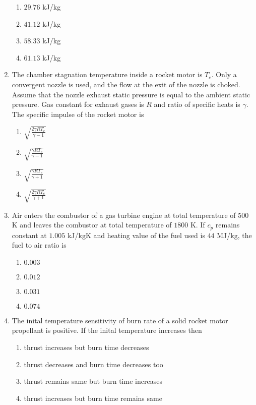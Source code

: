 \documentclass[journal,onecolumn]{IEEEtran}
\theoremstyle{remark}
\begin{document}
\begin{enumerate}
	\begin{enumerate}
		\item $29.76$ kJ/kg
		\item $41.12$ kJ/kg
		\item $58.33$ kJ/kg
		\item $61.13$ kJ/kg
	\end{enumerate}


    \item The chamber stagnation temperature inside a rocket motor is $T_e$. Only a convergent nozzle is used, and the flow at the exit of the nozzle is choked. Assume that the nozzle exhaust static pressure is equal to the ambient static pressure. Gas constant for exhaust gases is $R$ and ratio of specific heats is $\gamma$. The specific impulse of the rocket motor is

	\begin{enumerate}
		\item $\sqrt{\frac{2\gamma R T_e}{\gamma - 1}}$
		\item $\sqrt{\frac{\gamma R T_e}{\gamma - 1}}$
		\item $\sqrt{\frac{\gamma R T_e}{\gamma + 1}}$
		\item $\sqrt{\frac{2\gamma R T_e}{\gamma + 1}}$
	\end{enumerate}


    \item Air enters the combustor of a gas turbine engine at total temperature of $500$ K and leaves the combustor at total temperature of $1800$ K. If $c_p$ remains constant at $1.005$ kJ/kgK and heating value of the fuel used is $44$ MJ/kg, the fuel to air ratio is

	\begin{enumerate}
		\item $0.003$
		\item $0.012$
		\item $0.031$
		\item $0.074$
	\end{enumerate}


    \item The inital temperature sensitivity of burn rate of a solid rocket motor propellant is positive. If the inital temperature increases then 

	\begin{enumerate}
		\item thrust increases but burn time decreases
		\item thrust decreases and burn time decreases too
		\item thrust remains same but burn time increases
		\item thrust increases but burn time remains same
	\end{enumerate}



\end{enumerate}
\end{document}

